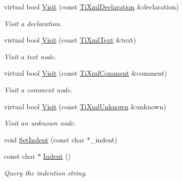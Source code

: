 \begin{DoxyCompactItemize}
virtual bool \hyperlink{class_ti_xml_printer_adaf7eec4dc43ad071ff52b60361574f5}{Visit} (const \hyperlink{class_ti_xml_declaration}{Ti\+Xml\+Declaration} \&declaration)
\begin{DoxyCompactList}\small\item\em Visit a declaration. \end{DoxyCompactList}\item 
\mbox{\label{class_ti_xml_printer_a0857c5d32c59b9a257f9a49cb9411df5}} 
virtual bool \hyperlink{class_ti_xml_printer_a0857c5d32c59b9a257f9a49cb9411df5}{Visit} (const \hyperlink{class_ti_xml_text}{Ti\+Xml\+Text} \&text)
\begin{DoxyCompactList}\small\item\em Visit a text node. \end{DoxyCompactList}\item 
\mbox{\label{class_ti_xml_printer_a9870423f5603630e6142f6bdb66dfb57}} 
virtual bool \hyperlink{class_ti_xml_printer_a9870423f5603630e6142f6bdb66dfb57}{Visit} (const \hyperlink{class_ti_xml_comment}{Ti\+Xml\+Comment} \&comment)
\begin{DoxyCompactList}\small\item\em Visit a comment node. \end{DoxyCompactList}\item 
\mbox{\label{class_ti_xml_printer_a08591a15c9a07afa83c24e08b03d6358}} 
virtual bool \hyperlink{class_ti_xml_printer_a08591a15c9a07afa83c24e08b03d6358}{Visit} (const \hyperlink{class_ti_xml_unknown}{Ti\+Xml\+Unknown} \&unknown)
\begin{DoxyCompactList}\small\item\em Visit an unknown node. \end{DoxyCompactList}\item 
void \hyperlink{class_ti_xml_printer_a213377a4070c7e625bae59716b089e5e}{Set\+Indent} (const char $\ast$\+\_\+indent)
\item 
\mbox{\label{class_ti_xml_printer_abb33ec7d4bad6aaeb57f4304394b133d}} 
const char $\ast$ \hyperlink{class_ti_xml_printer_abb33ec7d4bad6aaeb57f4304394b133d}{Indent} ()
\begin{DoxyCompactList}\small\item\em Query the indention string. \end{DoxyCompactList}\item 

\end{DoxyCompactItemize}
